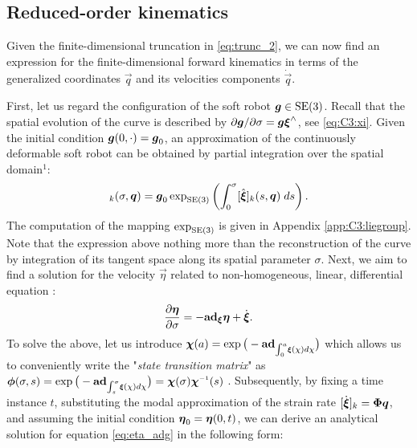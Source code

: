 \vspace{-2mm}
\subsection{Reduced-order kinematics}
Given the finite-dimensional truncation in \eqref{eq:trunc_2}, we can now find an expression for the finite-dimensional forward kinematics in terms of the generalized coordinates $\vec{q}$ and its velocities components $\dot{\vec{q}}$.

First, let us regard the configuration of the soft robot $\boldsymbol{g} \in \textup{\textrm{SE}}(3)$. Recall that the spatial evolution of the curve is described by $\partial \boldsymbol{g}/\partial\sigma = \boldsymbol{g} \boldsymbol{\xi}^\wedge$, see \eqref{eq:C3:xi}. Given the initial condition $\boldsymbol{g}(0,\cdot) = \boldsymbol{g}_0$, an approximation of the continuously deformable soft robot can be obtained by partial integration over the spatial domain$^{1}$: 
%
\begin{equation}
[\mat{g}]_k(\sigma,\vec{q}) = \mat{g}_0 \exp_{\SE{3}}\left(\int_0^\sigma [\hat{\vec{\xi}}]_k(s,\vec{q}) \; ds \right).
\label{eq:C3:mappingSE3g}
\end{equation}
%
The computation of the mapping $\exp_{\textup{\textrm{SE}}(3)}$ is given in Appendix \ref{app:C3:liegroup}. Note that the expression above nothing more than the reconstruction of the curve by integration of its tangent space along its spatial parameter $\sigma$. Next, we aim to find a solution for the velocity $\vec{\eta}$ related to non-homogeneous, linear, differential equation \cite{Renda2018}:
%
\begin{equation}
\frac{\partial \boldsymbol{\eta}}{\partial \sigma } = -\textbf{ad}_{{\boldsymbol{\xi}}} \boldsymbol{\eta} + \dot{\boldsymbol{\xi}}. \label{eq:eta_adg}
\end{equation}
%
To solve the above, let us introduce $\boldsymbol{\chi}(a) = \exp\big(-\textbf{ad}_{\small \int_0^a\!{\boldsymbol{\xi}}(\chi)d\chi}\big)$ which allows us to conveniently write the "\textit{state transition matrix}" as $\phiB(\sigma,s) = \exp\big(-\ad_{\small \int_s^\sigma\!\xiB(\chi)d\chi}\big) = \vec{\chi}(\sigma) \vec{\chi}\inv(s)$ \cite{Hairer2006,Magnus2006Oct}. Subsequently, by fixing a time instance $t$, substituting the modal approximation of the strain rate $[\dot{\boldsymbol{\xi}}]_k = {\boldsymbol{\Phi}} {\boldsymbol{q}}$, and assuming the initial condition ${\boldsymbol{\eta}}_0 = {\boldsymbol{\eta}}(0,t)$, we can derive an analytical solution for equation \eqref{eq:eta_adg} in the following form:
